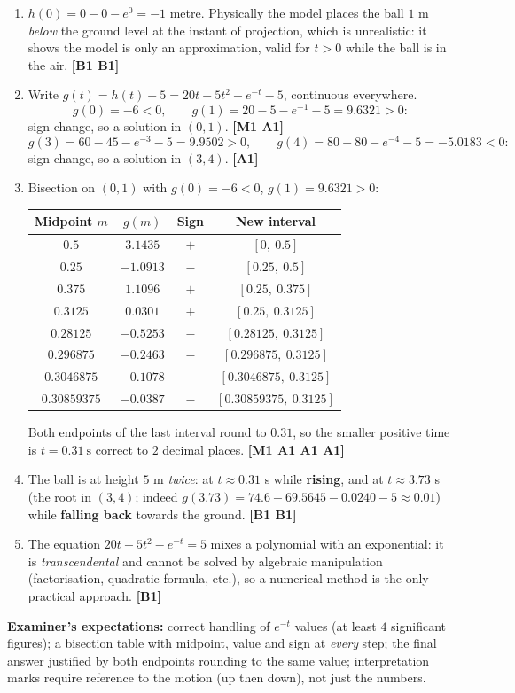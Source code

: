 \documentclass[11pt]{article}
\begin{document}
\begin{corrige}
\begin{enumerate}
\item $h(0) = 0 - 0 - e^{0} = -1$ metre. Physically the model places the ball $1$ m \emph{below} the ground level at the instant of projection, which is unrealistic: it shows the model is only an approximation, valid for $t > 0$ while the ball is in the air. \hfill \textbf{[B1 B1]}
\item Write $g(t) = h(t) - 5 = 20t - 5t^{2} - e^{-t} - 5$, continuous everywhere.
\[ g(0) = -6 < 0, \qquad g(1) = 20 - 5 - e^{-1} - 5 = 9.6321 > 0: \]
sign change, so a solution in $(0, 1)$. \hfill \textbf{[M1 A1]}
\[ g(3) = 60 - 45 - e^{-3} - 5 = 9.9502 > 0, \qquad g(4) = 80 - 80 - e^{-4} - 5 = -5.0183 < 0: \]
sign change, so a solution in $(3, 4)$. \hfill \textbf{[A1]}
\item Bisection on $(0, 1)$ with $g(0) = -6 < 0$, $g(1) = 9.6321 > 0$:
\begin{center}
\begin{tabular}{|c|c|c|c|}
\hline
\rowcolor{popblueL} Midpoint $m$ & $g(m)$ & Sign & New interval \\
\hline
$0.5$ & $3.1435$ & $+$ & $[0,\ 0.5]$ \\
$0.25$ & $-1.0913$ & $-$ & $[0.25,\ 0.5]$ \\
$0.375$ & $1.1096$ & $+$ & $[0.25,\ 0.375]$ \\
$0.3125$ & $0.0301$ & $+$ & $[0.25,\ 0.3125]$ \\
$0.28125$ & $-0.5253$ & $-$ & $[0.28125,\ 0.3125]$ \\
$0.296875$ & $-0.2463$ & $-$ & $[0.296875,\ 0.3125]$ \\
$0.3046875$ & $-0.1078$ & $-$ & $[0.3046875,\ 0.3125]$ \\
$0.30859375$ & $-0.0387$ & $-$ & $[0.30859375,\ 0.3125]$ \\
\hline
\end{tabular}
\end{center}
Both endpoints of the last interval round to $0.31$, so the smaller positive time is $\boxed{t = 0.31\ \text{s}}$ correct to $2$ decimal places. \hfill \textbf{[M1 A1 A1 A1]}
\item The ball is at height $5$ m \emph{twice}: at $t \approx 0.31$ s while \textbf{rising}, and at $t \approx 3.73$ s (the root in $(3,4)$; indeed $g(3.73) = 74.6 - 69.5645 - 0.0240 - 5 \approx 0.01$) while \textbf{falling back} towards the ground. \hfill \textbf{[B1 B1]}
\item The equation $20t - 5t^{2} - e^{-t} = 5$ mixes a polynomial with an exponential: it is \emph{transcendental} and cannot be solved by algebraic manipulation (factorisation, quadratic formula, etc.), so a numerical method is the only practical approach. \hfill \textbf{[B1]}
\end{enumerate}
\textbf{Examiner's expectations:} correct handling of $e^{-t}$ values (at least $4$ significant figures); a bisection table with midpoint, value and sign at \emph{every} step; the final answer justified by both endpoints rounding to the same value; interpretation marks require reference to the motion (up then down), not just the numbers.
\end{corrige}
\end{document}
